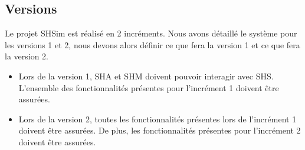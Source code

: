 \newpage
\subsection{Versions} %

Le projet \gls{SHSim} est réalisé en 2 incréments. Nous avons détaillé le système pour les versions 1 et 2, nous devons alors définir ce que fera la version 1 et ce
que fera la version 2.
\begin{itemize}
    \item Lors de la version 1, \gls{SHA} et \gls{SHM} doivent pouvoir interagir avec \gls{SHS}. L'ensemble des fonctionnalités présentes pour l'incrément 1 doivent être assurées.
    \item Lors de la version 2, toutes les fonctionnalités présentes lors de l'incrément 1 doivent être assurées. De plus, les fonctionnalités présentes pour l'incrément 2 doivent être assurées.
\end{itemize}